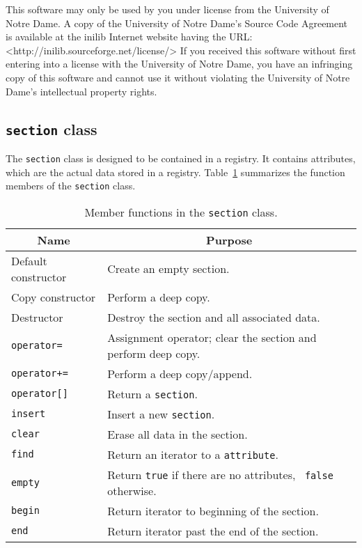 %
This software may only be used by you under license from the
University of Notre Dame.  A copy of the University of Notre Dame's
Source Code Agreement is available at the inilib Internet website
having the URL: <http://inilib.sourceforge.net/license/> If you
received this software without first entering into a license with the
University of Notre Dame, you have an infringing copy of this software
and cannot use it without violating the University of Notre Dame's
intellectual property rights.
% 
%

\subsection[section class]{{\tt section} class}

The {\tt section} class is designed to be contained in a registry.  It
contains attributes, which are the actual data stored in a registry.
Table~\ref{tbl:section-members} summarizes the function members of the
{\tt section} class.

\begin{table}[htbp]
  \begin{center}
    \leavevmode
    \begin{tabular}{|l|p{3in}|}
      \hline
      \multicolumn{1}{|c|}{Name} & \multicolumn{1}{c|}{Purpose} \\
      \hline
      Default constructor & Create an empty section. \\
      Copy constructor & Perform a deep copy. \\
      Destructor & Destroy the section and all associated data. \\
      \hline
      {\tt operator=} & Assignment operator; clear the section and
      perform deep copy.\\
      {\tt operator+=} & Perform a deep copy/append. \\
      {\tt operator[]} & Return a {\tt section}. \\
      {\tt insert} & Insert a new {\tt section}. \\
      {\tt clear} & Erase all data in the section. \\
      {\tt find} & Return an iterator to a {\tt attribute}. \\
      {\tt empty} & Return {\tt true} if there are no attributes, {\tt
        false} otherwise. \\
      {\tt begin} & Return iterator to beginning of the section. \\
      {\tt end} & Return iterator past the end of the section. \\
      \hline
    \end{tabular}
    \caption{Member functions in the {\tt section} class.}
    \label{tbl:section-members}
  \end{center}
\end{table}

